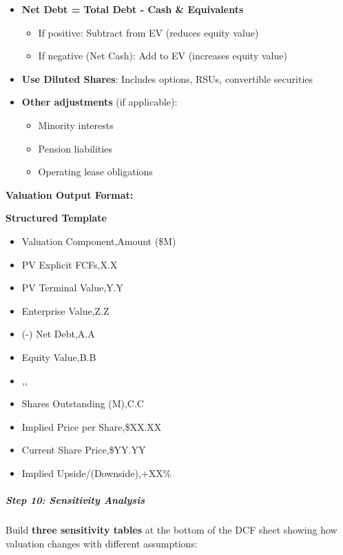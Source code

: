 \documentclass[11pt]{article}
\begin{document}
\begin{itemize}[leftmargin=*,itemsep=2pt,topsep=2pt]
\item {} \textbf{Net Debt = Total Debt - Cash \& Equivalents}
\begin{itemize}[leftmargin=*,itemsep=2pt,topsep=2pt]
\item {} If positive: Subtract from EV (reduces equity value)
\item {} If negative (Net Cash): Add to EV (increases equity value)
\end{itemize}
\item {} \textbf{Use Diluted Shares}: Includes options, RSUs, convertible securities
\item {} \textbf{Other adjustments} (if applicable):
\begin{itemize}[leftmargin=*,itemsep=2pt,topsep=2pt]
\item {} Minority interests
\item {} Pension liabilities
\item {} Operating lease obligations
\end{itemize}
\end{itemize}

\textbf{Valuation Output Format:}

\textbf{Structured Template}
\begin{itemize}[leftmargin=*,itemsep=2pt,topsep=2pt]
\item {} Valuation Component,Amount (\$M)
\item {} PV Explicit FCFs,X.X
\item {} PV Terminal Value,Y.Y
\item {} Enterprise Value,Z.Z
\item {} (-) Net Debt,A.A
\item {} Equity Value,B.B
\item {} ,,
\item {} Shares Outstanding (M),C.C
\item {} Implied Price per Share,\$XX.XX
\item {} Current Share Price,\$YY.YY
\item {} Implied Upside/(Downside),+XX\%
\end{itemize}

\subparagraph{Step 10: Sensitivity Analysis}\mbox{}\par

Build \textbf{three sensitivity tables} at the bottom of the DCF sheet showing how valuation changes with different assumptions:
\end{document}
